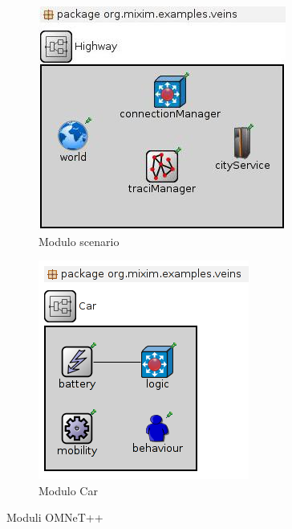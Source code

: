 \begin{figure}[H]
        \centering
		\begin{subfigure}[H]{0.45\textwidth}
                \includegraphics[width=\textwidth]{assets/module-scenario.jpg}
                \caption{Modulo scenario}
                \label{fig:module-car}
        \end{subfigure}
        \qquad
        \begin{subfigure}[H]{0.45\textwidth}
                \includegraphics[width=\textwidth]{assets/module-car.png}
                \caption{Modulo Car}
                \label{fig:module-scenario}
        \end{subfigure}%
        \caption{Moduli OMNeT++}
\end{figure}

